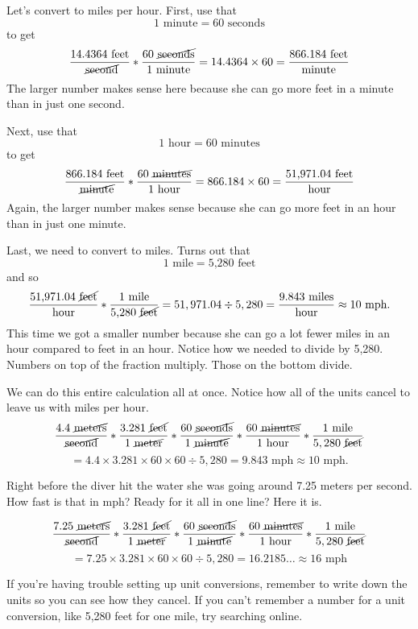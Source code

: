 Let's convert to miles per hour.  First, use that
$$1 \text{ minute} = 60 \text{ seconds}$$ to get
$$ \frac{14.4364  \text{ feet}}{\text{ \cancel{second}}} \ast \frac{60 \text{  \cancel{seconds}}}{1\text{ minute}} =  14.4364 \times 60 = \frac{866.184 \text{ feet}}{\text{minute}}$$ 
The larger number makes sense here because she can go more feet in a minute than in just one second.  

Next, use that
$$1 \text{ hour} = 60 \text{ minutes}$$ to get
$$ \frac{866.184 \text{ feet}}{\text{ \cancel{minute}}}\ast  \frac{60 \text{ \cancel{minutes}}}{1\text{ hour}} = 866.184 \times 60 = \frac{ \text{51,971.04 feet}}{\text{hour}}$$  
Again, the larger number makes sense because she can go more feet in an hour than in just one minute.  

Last, we need to convert to miles.  Turns out that 
$$1 \text{ mile} = \text{5,280 feet}$$ and so
$$ \frac{ \text{51,971.04 \cancel{feet}}}{\text{hour}}\ast  \frac{1 \text{ mile}}{\text{5,280 \cancel{feet}}} = 51,971.04 \div 5,280 = \frac{9.843 \text{ miles}}{\text{hour}} \approx 10 \text{ mph}.$$  
This time we got a smaller number because she can go a lot fewer miles in an hour compared to feet in an hour.  Notice how we needed to divide by 5,280.  Numbers on top of the fraction multiply. Those on the bottom divide.

We can do this entire calculation all at once.  Notice how all of the units cancel to leave us with miles per hour.  $$ \frac{4.4 \text{ \cancel{meters}}}{\text{\cancel{second}}} \ast \frac{3.281 \text{ \cancel{feet}}}{1 \text{ \cancel{meter}}}  \ast \frac{60 \text{ \cancel{seconds}}}{1 \text{ \cancel{minute}}}\ast  \frac{60 \text{ \cancel{minutes}}}{1\text{ hour}}\ast  \frac{1 \text{ mile}}{5,280\text{ \cancel{feet}}} $$
$$= 4.4 \times 3.281 \times 60 \times 60 \div 5,280 = 9.843 \text{ mph} \approx 10 \text{ mph}.$$  

Right before the diver hit the water she was going around 7.25 meters per second.  How fast is that in mph? Ready for it all in one line?  Here it is.

$$ \frac{7.25 \text{ \cancel{meters}}}{\text{\cancel{second}}} \ast \frac{3.281 \text{ \cancel{feet}}}{1 \text{ \cancel{meter}}}  \ast \frac{60 \text{ \cancel{seconds}}}{1 \text{ \cancel{minute}}}\ast  \frac{60 \text{ \cancel{minutes}}}{1\text{ hour}}\ast  \frac{1 \text{ mile}}{5,280\text{ \cancel{feet}}} $$
$$=7.25 \times 3.281 \times 60 \times 60 \div 5,280 = 16.2185\ldots \approx 16 \text{ mph}$$

If you're having trouble setting up unit conversions, remember to write down the units so you can see how they cancel.  If you can't remember a number for a unit conversion, like 5,280 feet for one mile, try searching online.

 
